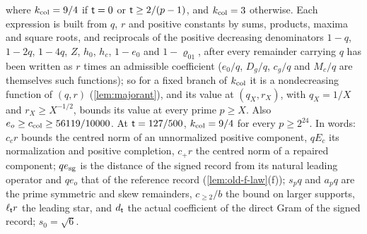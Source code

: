 where $k_{\rm col}=9/4$ if $\mathsf t=0$ or $\mathsf t\ge2/(p-1)$, and $k_{\rm col}=3$
otherwise. Each expression is built from $q$, $r$ and positive constants by
sums, products, maxima and square roots, and reciprocals of the positive
decreasing denominators $1-q$, $1-2q$, $1-4q$, $Z$, $h_0$, $h_c$, $1-e_0$ and
$1-\varrho_{01}$, after every remainder carrying $q$ has been written as $r$ times
an admissible coefficient ($e_0/q$, $D_g/q$, $c_g/q$ and $M_c/q$ are themselves
such functions); so for a fixed branch of $k_{\rm col}$ it is a nondecreasing
function of $(q,r)$ (\cref{lem:majorant}), and its value at $(q_X,r_X)$, with
$q_X=1/X$ and $r_X\ge X^{-1/2}$, bounds its value at every prime $p\ge X$. Also
$e_o\ge c_{\rm col}\ge56119/10000$. At $\mathsf t=127/500$, $k_{\rm col}=9/4$ for every
$p\ge2^{24}$. In words: $c_cr$ bounds the centred norm of an unnormalized
positive component, $qE_c$ its normalization and positive completion, $c_+r$ the
centred norm of a repaired component; $qe_{\rm sg}$ is the distance of the signed
record from its natural leading operator and $qe_o$ that of the reference
record (\cref{lem:old-f-law}(f)); $s_pq$ and $a_pq$ are the prime symmetric and
skew remainders, $c_{\ge2}/b$ the bound on larger supports, $\ell_\mathsf t r$ the
leading star, and $d_\mathsf t$ the actual coefficient of the direct Gram of the
signed record; $s_0=\sqrt6$.

